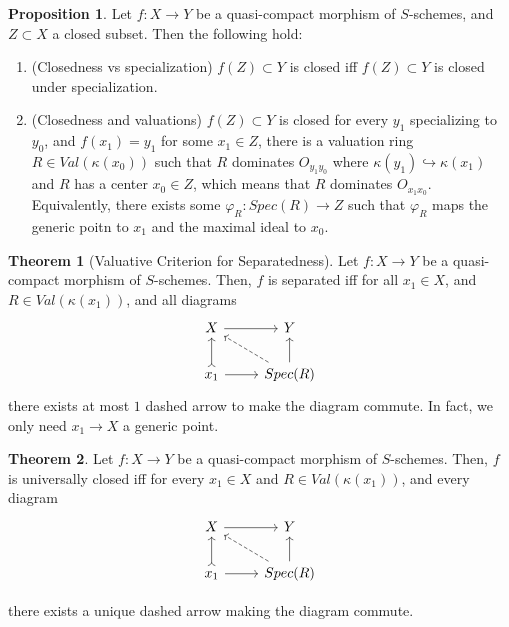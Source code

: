 \documentclass{article}
\theoremstyle{definition}
\newtheorem{theorem}{Theorem}[section]
\theoremstyle{definition}
\theoremstyle{definition}
\theoremstyle{definition}
\newtheorem{proposition}{Proposition}[theorem]
\theoremstyle{definition}
\theoremstyle{definition}
\theoremstyle{definition}
\begin{document}
\begin{tcolorbox}[colback=blue!5!white,colframe=blue!30!white]
\begin{proposition}
Let $f: X\to Y$ be a quasi-compact morphism of $S$-schemes, and $Z\subset X$ a closed subset. Then the following hold:

\begin{enumerate}
    \item (Closedness vs specialization) $f(Z)\subset Y$ is closed iff $f(Z)\subset Y$ is closed under specialization. 
    \item (Closedness and valuations) $f(Z)\subset Y$ is closed for every $y_1$ specializing to $y_0$, and $f(x_1)=y_1$ for some $x_1\in Z$, there is a valuation ring $R\in Val(\kappa(x_0))$ such that $R$ dominates $O_{y_1y_0}$ where $\kappa(y_1)\hookrightarrow \kappa(x_1)$ and $R$ has a center $x_0\in Z$, which means that $R$ dominates $O_{x_1x_0}$. Equivalently, there exists some $\varphi_R: Spec(R)\to Z$ such that $\varphi_R$ maps the generic poitn to $x_1$ and the maximal ideal to $x_0$. 
\end{enumerate}
\end{proposition}
\end{tcolorbox}



\begin{tcolorbox}[colback=red!5!white,colframe=red!30!white]
\begin{theorem}[Valuative Criterion for Separatedness]
    Let $f: X\to Y$ be a quasi-compact morphism of $S$-schemes. Then, $f$ is separated iff for all $x_1\in X$, and $R\in Val(\kappa(x_1))$, and all diagrams
    \[\begin{tikzcd}
        X & Y \\
        {x_1} & {Spec(R)}
        \arrow[from=1-1, to=1-2]
        \arrow[tail, from=2-1, to=1-1]
        \arrow[from=2-1, to=2-2]
        \arrow[dashed, from=2-2, to=1-1]
        \arrow[from=2-2, to=1-2]
    \end{tikzcd}\]
    there exists at most $1$ dashed arrow to make the diagram commute. In fact, we only need $x_1\to X$ a generic point. 

\end{theorem}
\end{tcolorbox}


\begin{tcolorbox}[colback=red!5!white,colframe=red!30!white]
\begin{theorem}
Let $f: X\to Y$ be a quasi-compact morphism of $S$-schemes. Then, $f$ is universally closed iff for every $x_1\in X$ and $R\in Val(\kappa(x_1))$, and every diagram
\[\begin{tikzcd}
    X & Y \\
    {x_1} & {Spec(R)}
    \arrow[from=1-1, to=1-2]
    \arrow[tail, from=2-1, to=1-1]
    \arrow[from=2-1, to=2-2]
    \arrow[dashed, from=2-2, to=1-1]
    \arrow[from=2-2, to=1-2]
\end{tikzcd}\]

there exists a unique dashed arrow making the diagram commute.
\end{theorem}
\end{tcolorbox}
\end{document}
